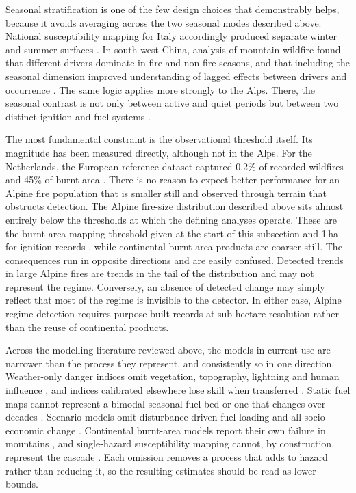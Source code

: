 \documentclass[11pt,a4paper]{article}
\begin{document}
Seasonal stratification is one of the few design choices that demonstrably helps, because it avoids averaging across the two seasonal modes described above. National susceptibility mapping for Italy accordingly produced separate winter and summer surfaces \citep{trucchia_defining_2022}. In south-west China, analysis of mountain wildfire found that different drivers dominate in fire and non-fire seasons, and that including the seasonal dimension improved understanding of lagged effects between drivers and occurrence \citep{wang_seasonal_2023}. The same logic applies more strongly to the Alps. There, the seasonal contrast is not only between active and quiet periods but between two distinct ignition and fuel systems \citep{vacchiano_modeling_2018, bercak_combination_2024}.

The most fundamental constraint is the observational threshold itself. Its magnitude has been measured directly, although not in the Alps. For the Netherlands, the European reference dataset captured 0.2\% of recorded wildfires and 45\% of burnt area \citep{stoof_temperate_2024}. There is no reason to expect better performance for an Alpine fire population that is smaller still and observed through terrain that obstructs detection. The Alpine fire-size distribution described above sits almost entirely below the thresholds at which the defining analyses operate. These are the burnt-area mapping threshold given at the start of this subsection \citep{beloiu_climatedriven_2026} and 1\,ha for ignition records \citep{gelabert_assessing_2025}, while continental burnt-area products are coarser still. The consequences run in opposite directions and are easily confused. Detected trends in large Alpine fires are trends in the tail of the distribution and may not represent the regime. Conversely, an absence of detected change may simply reflect that most of the regime is invisible to the detector. In either case, Alpine regime detection requires purpose-built records at sub-hectare resolution rather than the reuse of continental products.

Across the modelling literature reviewed above, the models in current use are narrower than the process they represent, and consistently so in one direction. Weather-only danger indices omit vegetation, topography, lightning and human influence \citep{muller_towards_2020}, and indices calibrated elsewhere lose skill when transferred \citep{de_angelis_modelling_2015, gelabert_assessing_2025}. Static fuel maps cannot represent a bimodal seasonal fuel bed or one that changes over decades \citep{bebi_changes_2017, frei_evidence_2023}. Scenario models omit disturbance-driven fuel loading and all socio-economic change \citep{gerberding_mapping_2025}. Continental burnt-area models report their own failure in mountains \citep{forrest_understanding_2024}, and single-hazard susceptibility mapping cannot, by construction, represent the cascade \citep{trucchia_defining_2022}. Each omission removes a process that adds to hazard rather than reducing it, so the resulting estimates should be read as lower bounds.
\end{document}
